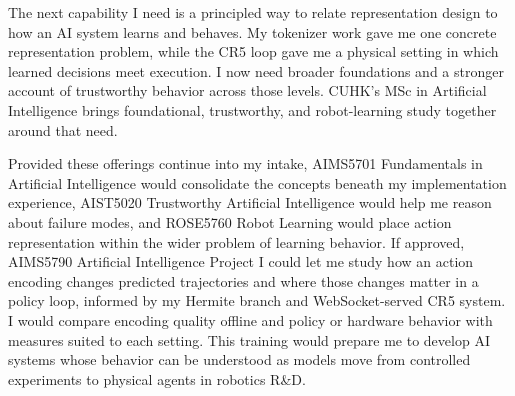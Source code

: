 The next capability I need is a principled way to relate representation design to how an AI system learns and behaves. My tokenizer work gave me one concrete representation problem, while the CR5 loop gave me a physical setting in which learned decisions meet execution. I now need broader foundations and a stronger account of trustworthy behavior across those levels. CUHK's MSc in Artificial Intelligence brings foundational, trustworthy, and robot-learning study together around that need.

Provided these offerings continue into my intake, AIMS5701 Fundamentals in Artificial Intelligence would consolidate the concepts beneath my implementation experience, AIST5020 Trustworthy Artificial Intelligence would help me reason about failure modes, and ROSE5760 Robot Learning would place action representation within the wider problem of learning behavior. If approved, AIMS5790 Artificial Intelligence Project I could let me study how an action encoding changes predicted trajectories and where those changes matter in a policy loop, informed by my Hermite branch and WebSocket-served CR5 system. I would compare encoding quality offline and policy or hardware behavior with measures suited to each setting. This training would prepare me to develop AI systems whose behavior can be understood as models move from controlled experiments to physical agents in robotics R\&D.
